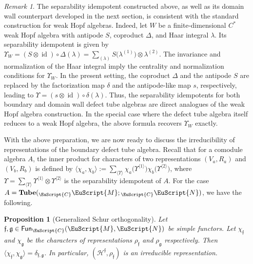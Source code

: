 \documentclass[a4paper,11pt]{article}
\newtheorem{proposition}[theorem]{Proposition}
\theoremstyle{definition}
\theoremstyle{remark}
\newtheorem{remark}[theorem]{Remark}
\newcommand\eC           {\EuScript{C}}
\newcommand\eM          {\EuScript{M}}
\newcommand\eN         {\EuScript{N}}
\newcommand{\id}{\operatorname{id}}
\newcommand{\Tube}{\mathbf{Tube}}
\newcommand{\Fun}{\mathsf{Fun}}
\begin{document}
\begin{remark}
    The separability idempotent constructed above, as well as its domain wall counterpart developed in the next section, is consistent with the standard construction for weak Hopf algebras. Indeed, let $W$ be a finite-dimensional $C^*$ weak Hopf algebra with antipode $S$, coproduct $\Delta$, and Haar integral $\lambda$. Its separability idempotent is given by $\Upsilon_W = (S\otimes\id)\circ\Delta(\lambda) = \sum_{(\lambda)} S\bigl(\lambda^{(1)}\bigr)\otimes\lambda^{(2)}$. The invariance and normalization of the Haar integral imply the centrality and normalization conditions for $\Upsilon_W$. In the present setting, the coproduct $\Delta$ and the antipode $S$ are replaced by the factorization map $\delta$ and the antipode-like map $s$, respectively, leading to $\Upsilon = (s\otimes\id)\circ\delta(\lambda)$. 
    Thus, the separability idempotents for both boundary and domain wall defect tube algebras are direct analogues of the weak Hopf algebra construction. In the special case where the defect tube algebra itself reduces to a weak Hopf algebra, the above formula recovers $\Upsilon_W$ exactly.
\end{remark}


With the above preparation, we are now ready to discuss the irreducibility of representations of the boundary defect tube algebra.
Recall that for a comodule algebra $A$, the inner product for characters of two representations $(V_a,R_a)$ and $(V_b,R_b)$ is defined by $\langle \chi_a,\chi_b \rangle := \sum_{\langle\Upsilon\rangle}\chi_a\bigl(\Upsilon^{\langle 1\rangle}\bigr) \chi_b\bigl(\Upsilon^{\langle 2\rangle}\bigr)$, where $\Upsilon=\sum_{\langle \Upsilon \rangle} \Upsilon^{\langle 1 \rangle}\otimes \Upsilon^{\langle 2 \rangle}$ is the separability idempotent of $A$. For the case $A=\Tube({}_\eC\eM;{}_\eC\eN)$, we have the following.  


\begin{proposition}[Generalized Schur orthogonality] \label{prop:Schur-orth}
    Let $\mathfrak{f}, \mathfrak{g}\in \Fun_{\eC}(\eM,\eN)$ be simple functors. Let $\chi_\mathfrak{f}$ and $\chi_{\mathfrak{g}}$ be the characters of representations $\rho_\mathfrak{f}$ and $\rho_{\mathfrak{g}}$ respectively. Then $\langle\chi_\mathfrak{f},\chi_\mathfrak{g}\rangle =\delta_{\mathfrak{f},\mathfrak{g}}$. In particular, $(\mathcal{H}^{\mathfrak{f}},\rho_\mathfrak{f})$ is an irreducible representation. 
\end{proposition}
\end{document}
